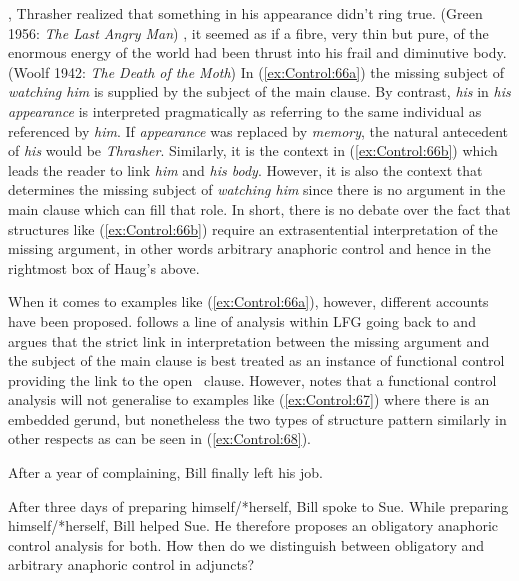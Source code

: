 \documentclass[output=paper,hidelinks]{langscibook}
\begin{document}
\ea\label{ex:Control:66}
\ea\label{ex:Control:66a} , Thrasher realized that something in his appearance didn't
  ring true. (Green 1956: \emph{The Last Angry Man})
\ex\label{ex:Control:66b} , it seemed as if a fibre, very thin but pure, of the enormous energy of the world had been thrust into his frail and diminutive body. (Woolf 1942: \emph{The Death of the Moth})
\z\z
In (\ref{ex:Control:66a}) the missing subject of \emph{watching him} is supplied by the subject of the main clause. By contrast, \emph{his} in \emph{his appearance} is interpreted pragmatically as referring to the same individual as referenced by \emph{him}. If \emph{appearance} was replaced by \emph{memory}, the natural antecedent of \emph{his} would be \emph{Thrasher}. Similarly, it is the context in (\ref{ex:Control:66b}) which leads the reader to link \emph{him} and \emph{his body}. However, it is also the context that determines the missing subject of \emph{watching him} since there is no argument in the main clause which can fill that role. In short, there is no debate over the fact that structures like (\ref{ex:Control:66b}) require an extrasentential interpretation of the missing argument, in other words arbitrary anaphoric control and hence in the rightmost box of Haug's  above.

When it comes to examples like (\ref{ex:Control:66a}), however, different accounts have been proposed. \citet{Donaldson2021} follows a line of analysis within LFG going back to \citet{mohanan83} and argues that the strict link in interpretation between the missing argument and the subject of the main clause is best treated as an instance of functional control providing the link to the open \XADJ\ clause. However, \citet{Donaldson2021b} notes that a functional control analysis will not generalise to examples like (\ref{ex:Control:67}) where there is an embedded gerund, but nonetheless the two types of structure pattern similarly in other respects as can be seen in (\ref{ex:Control:68}).

\ea\label{ex:Control:67}
After a year of complaining, Bill finally left his job.
\z

\ea\label{ex:Control:68}
\ea\label{ex:Control:68a} After three days of preparing himself/*herself, Bill spoke to Sue.
\ex\label{ex:Control:68b} While preparing himself/*herself, Bill
helped Sue.
\z\z
He therefore proposes an obligatory anaphoric control analysis for both. How then do we distinguish between obligatory and arbitrary anaphoric control in adjuncts?
\end{document}
